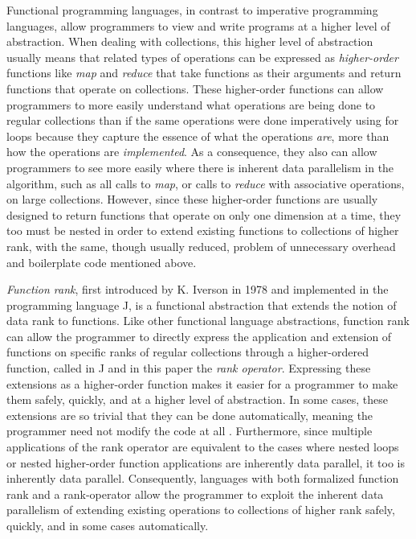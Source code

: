 Functional programming languages, in contrast to imperative programming languages, 
allow programmers to view and write programs at a higher level of abstraction.
When dealing with collections, 
this higher level of abstraction usually means that related types of operations can be expressed as \textit{higher-order} functions 
like \textit{map} and \textit{reduce} that take functions as their arguments and return functions that operate on collections.
These higher-order functions can allow programmers to more easily understand what operations are being done to regular collections 
than if the same operations were done imperatively using for loops 
because they capture the essence of what the operations \textit{are}, more than how the operations are \textit{implemented}.
As a consequence, they also can allow programmers 
to see more easily where there is inherent data parallelism in the algorithm, 
such as all calls to \textit{map}, or calls to \textit{reduce} with associative operations, on large collections.
However, since these higher-order functions are usually designed to return functions that operate on only one dimension at a time, 
they too must be nested in order to extend existing functions to collections of higher rank, 
with the same, though usually reduced, problem of unnecessary overhead and boilerplate code mentioned above.

\textit{Function rank}, first introduced by K. Iverson in 1978\cite{opandfunc} 
and implemented in the programming language J, 
is a functional abstraction that extends the notion of data rank to functions. 
Like other functional language abstractions, 
function rank can allow the programmer to directly express 
the application and extension of functions on specific ranks of regular collections 
through a higher-ordered function, called in J and in this paper the \textit{rank operator}\cite{jvocab}.
Expressing these extensions as a higher-order function 
makes it easier for a programmer to make them safely, quickly, and at a higher level of abstraction.
In some cases, these extensions are so trivial that they can be done automatically, 
meaning the programmer need not modify the code at all\cite{jvocab} \cite{rankanduni}. 
Furthermore, since multiple applications of the rank operator 
are equivalent to the cases where nested loops or nested higher-order function applications are inherently data parallel, 
it too is inherently data parallel.
Consequently, languages with both formalized function rank and a rank-operator allow the programmer to 
exploit the inherent data parallelism of extending existing operations to collections of higher rank 
safely, quickly, and in some cases automatically.

